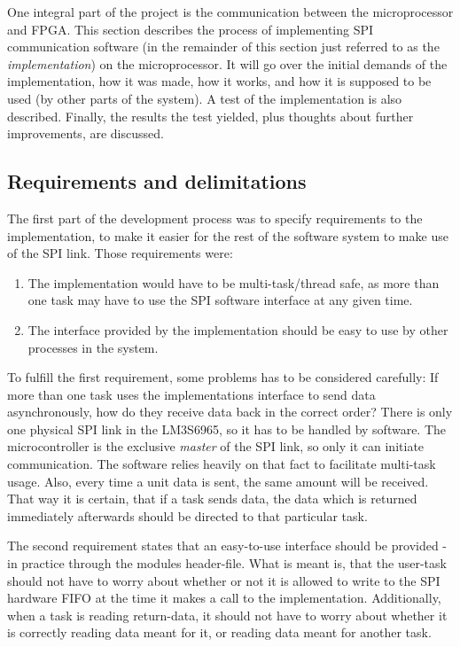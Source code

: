 \label{sec:armspi}
One integral part of the project is the communication between the microprocessor and FPGA. This section describes the process of implementing SPI communication software (in the remainder of this section just referred to as the \textit{implementation}) on the microprocessor. It will go over the initial demands of the implementation, how it was made, how it works, and how it is supposed to be used (by other parts of the system). A test of the implementation is also described. Finally, the results the test yielded, plus thoughts about further improvements, are discussed.

\subsection{Requirements and delimitations}\label{sec:spi_software_reqs}
The first part of the development process was to specify requirements to the implementation, to make it easier for the rest of the software system to make use of the SPI link. Those requirements were:
\begin{enumerate}
  \item The implementation would have to be multi-task/thread safe, as more than one task may have to use the SPI software interface at any given time.
  \item The interface provided by the implementation should be easy to use by other processes in the system.
\end{enumerate}

To fulfill the first requirement, some problems has to be considered carefully: If more than one task uses the implementations interface to send data asynchronously, how do they receive data back in the correct order? There is only one physical SPI link in the LM3S6965, so it has to be handled by software.
The microcontroller is the exclusive \textit{master} of the SPI link, so only it can initiate communication. The software relies heavily on that fact to facilitate multi-task usage. Also, every time a unit data is sent, the same amount will be received. That way it is certain, that if a task sends data, the data which is returned immediately afterwards should be directed to that particular task.

The second requirement states that an easy-to-use interface should be provided - in practice through the modules header-file. What is meant is, that the user-task should not have to worry about whether or not it is allowed to write to the SPI hardware FIFO at the time it makes a call to the implementation. Additionally, when a task is reading return-data, it should not have to worry about whether it is correctly reading data meant for it, or reading data meant for another task.

